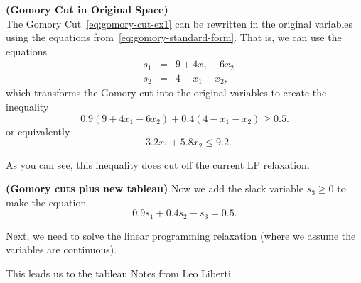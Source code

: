 \documentclass[../open-optimization/open-optimization.tex]{subfiles}
\begin{document}
\begin{example}\textbf{(Gomory Cut in Original Space)}\\

The Gomory Cut~\eqref{eq:gomory-cut-ex1} can be rewritten in the original variables using the equations from~\eqref{eq:gomory-standard-form}.  That is, we can use the equations
\begin{equation}
\label{eq:gomory-standard-form-equations}
\begin{array}{lrcl}
 & s_1 & = & 9 + 4x_1 - 6x_2\\
&s_2  & = & 4 - x_1 - x_2,
\end{array}
\end{equation}
which transforms the Gomory cut into the original variables to create the inequality
\begin{equation*}
\label{eq:gomory-cut-ex1-original}
0.9 (9 + 4x_1 - 6x_2) + 0.4(4 - x_1 - x_2) \geq 0.5.
\end{equation*}
or equivalently
\begin{equation}
\label{eq:gomory-cut-ex1-original}
- 3.2 x_1 + 5.8 x_2 \leq 9.2.
\end{equation}
%

As you can see, this inequality does cut off the current LP relaxation.

\end{example}


\begin{example}{\textbf{(Gomory  cuts plus new tableau)}}{}
Now we add the slack variable $s_3 \geq 0$ to make the equation
\begin{equation}
0.9 s_1 + 0.4 s_2 - s_3 = 0.5.
\end{equation}


\end{example}


Next, we need to solve the linear programming relaxation (where we assume the variables are continuous).


This leads us to the tableau
Notes from Leo Liberti\\
\end{document}

